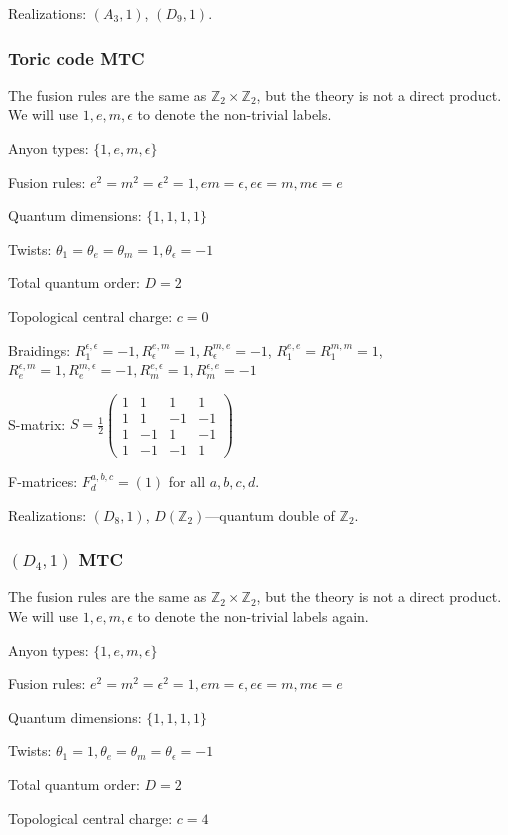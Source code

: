 \documentclass[12pt,psamsfonts]{amsart}
\newcommand{\e}{{\epsilon}}
\newcommand{\Z}{\mathbb Z}
\numberwithin{equation}{section}
\theoremstyle{definition}
\begin{document}
Realizations: $(A_3,1)$, $(D_9,1)$.

\subsubsection{Toric code MTC}

The fusion rules are the same as $\Z_2\times \Z_2$, but the theory
is not a direct product. We will use $1,e,m, \e$ to denote the
non-trivial labels.

Anyon types: $\{1,e,m,\e\}$

Fusion rules: $e^2=m^2=\e^2=1, em=\e,e\e=m,m\e=e$

Quantum dimensions: $\{1,1,1,1\}$

Twists: $\theta_1=\theta_e=\theta_m=1, \theta_{\e}=-1$

Total quantum order: $D=2$

Topological central charge: $c=0$

Braidings: $R^{\e,\e}_1=-1, R^{e,m}_{\e}=1,R^{m,e}_{\e}=-1$,
$R^{e,e}_{1}=R^{m,m}_{1}=1$,
$R^{\e,m}_{e}=1,R^{m,\e}_{e}=-1,R^{e,\e}_{m}=1, R^{\e,e}_{m}=-1$

S-matrix: $S=\frac{1}{2}\begin{pmatrix}
   1& 1& 1 &1 \\
   1 & 1& -1&-1  \\
   1 & -1 &1 &-1 \\
   1 &-1 & -1& 1
 \end{pmatrix}$

F-matrices: $F^{a,b,c}_d=(1)$ for all $a,b,c,d$.

Realizations: $(D_8,1)$,  $D(\Z_2)$---quantum double of $\Z_2$.

\subsubsection{$(D_4,1)$ MTC}

The fusion rules are the same as $\Z_2\times \Z_2$, but the theory
is not a direct product. We will use $1,e,m, \e$ to denote the
non-trivial labels again.

Anyon types: $\{1,e,m,\e\}$

Fusion rules: $e^2=m^2=\e^2=1, em=\e,e\e=m,m\e=e$

Quantum dimensions: $\{1,1,1,1\}$

Twists: $\theta_1=1, \theta_e=\theta_m=\theta_{\e}=-1$

Total quantum order: $D=2$

Topological central charge: $c=4$
\end{document}
